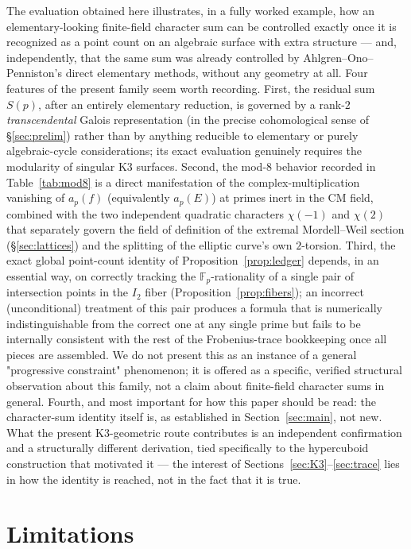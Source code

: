 \documentclass[11pt]{amsart}
\theoremstyle{definition}
\newcommand{\Fp}{\mathbb{F}_p}
\begin{document}
The evaluation obtained here illustrates, in a fully worked example, how an elementary-looking finite-field character sum can be controlled exactly once it is recognized as a point count on an algebraic surface with extra structure — and, independently, that the same sum was already controlled by Ahlgren--Ono--Penniston's direct elementary methods, without any geometry at all. Four features of the present family seem worth recording. First, the residual sum $S(p)$, after an entirely elementary reduction, is governed by a rank-$2$ \emph{transcendental} Galois representation (in the precise cohomological sense of \S\ref{sec:prelim}) rather than by anything reducible to elementary or purely algebraic-cycle considerations; its exact evaluation genuinely requires the modularity of singular K3 surfaces. Second, the mod-$8$ behavior recorded in Table~\ref{tab:mod8} is a direct manifestation of the complex-multiplication vanishing of $a_p(f)$ (equivalently $a_p(E)$) at primes inert in the CM field, combined with the two independent quadratic characters $\chi(-1)$ and $\chi(2)$ that separately govern the field of definition of the extremal Mordell--Weil section (\S\ref{sec:lattices}) and the splitting of the elliptic curve's own $2$-torsion. Third, the exact global point-count identity of Proposition~\ref{prop:ledger} depends, in an essential way, on correctly tracking the $\Fp$-rationality of a single pair of intersection points in the $I_2$ fiber (Proposition~\ref{prop:fibers}); an incorrect (unconditional) treatment of this pair produces a formula that is numerically indistinguishable from the correct one at any single prime but fails to be internally consistent with the rest of the Frobenius-trace bookkeeping once all pieces are assembled. We do not present this as an instance of a general "progressive constraint" phenomenon; it is offered as a specific, verified structural observation about this family, not a claim about finite-field character sums in general. Fourth, and most important for how this paper should be read: the character-sum identity itself is, as established in Section~\ref{sec:main}, not new. What the present K3-geometric route contributes is an independent confirmation and a structurally different derivation, tied specifically to the hypercuboid construction that motivated it — the interest of Sections~\ref{sec:K3}--\ref{sec:trace} lies in how the identity is reached, not in the fact that it is true.

\section{Limitations}
\label{sec:limitations}
\end{document}
